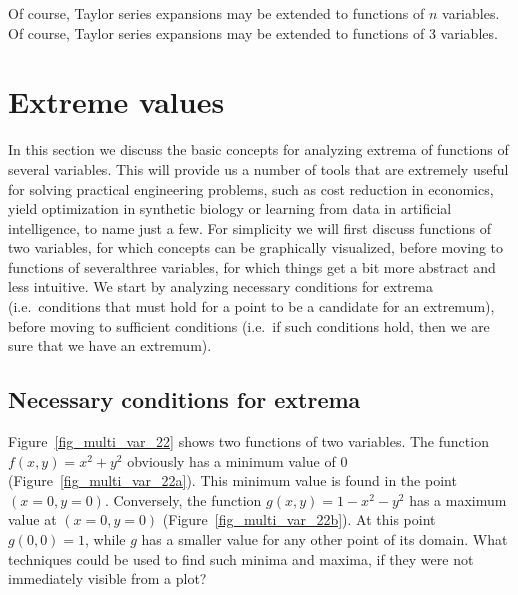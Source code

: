 \ifanalysis
Of course, Taylor series expansions may be extended to functions of $n$ variables. 
\fi
\ifcalculus
Of course, Taylor series expansions may be extended to functions of 3 variables. 
\fi


\section{Extreme values}\label{sec:multi_extreme_values}
\ifcalculus
In this section we discuss the basic concepts for analyzing extrema of functions of several variables. This will provide us a number of tools that are extremely useful for solving practical engineering problems, such as cost reduction in economics, yield optimization in synthetic biology or learning from data in artificial intelligence, to name just a few. For simplicity we will first discuss functions of two variables, for which concepts can be graphically visualized, before moving to functions of \ifanalysis several\fi \ifcalculus three \fi variables, for which things get a bit more abstract and less intuitive. We start by analyzing necessary conditions for extrema (i.e.\ conditions that must hold for a point to be a candidate for an extremum), before moving to sufficient conditions (i.e.\ if such conditions hold, then we are sure that we have an extremum). 


\subsection{Necessary conditions for extrema}
\label{FTV}

Figure~\ref{fig_multi_var_22} shows two functions of two variables. The function $f(x,y) = x^2 + y^2$ obviously has a minimum value of $0$ (Figure~\ref{fig_multi_var_22a}). This minimum value is found in the point $(x=0,y=0)$. Conversely, the function $g(x,y) = 1 - x^2 - y^2$ has a maximum value at $(x=0,y=0)$ (Figure~\ref{fig_multi_var_22b}). At this point $g(0,0)=1$, while $g$ has a smaller value for any other point of its domain. What techniques could be used to find such minima and maxima, if they were not immediately visible from a plot? 


